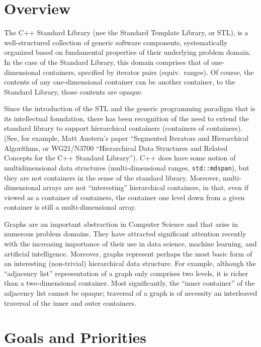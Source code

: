 
\section{Overview}

The C++ Standard Library (nee the Standard Template Library, or STL), is a well-structured collection of generic
software components, systematically organized based on fundamental properties of their underlying problem
domain.  In the case of the Standard Library, this domain comprises that of one-dimensional containers,
specified by iterator pairs (equiv.\ ranges).  Of course, the contents of any one-dimensional container can
be another container, to the Standard Library, those contents are opaque.

Since the introduction of the STL and the generic programming paradigm that is its
intellectual foundation, there has been recognition of the need to extend the
standard library to support hierarchical containers (containers of containers).
(See, for example, Matt Austern's paper ``Segmented Iterators and Hierarchical Algorithms,
or WG21/N3700
``Hierarchical Data Structures and Related Concepts for the C++ Standard Library'').
C++ does have some notion of multidimensional data structures (multi-dimensional ranges,
\lstinline{std::mdspan}), but they are not
containers in the sense of the standard library.  Moreover, multi-dimensional arrays
are not ``interesting'' hierarchical containers, in that, even if viewed as a
container of containers, the container one level down from a given container is
still a multi-dimensional array.

Graphs are an important abstraction in Computer Science and that arise in numerous problem domains.  They have
attracted significant attention recently with the increasing importance of their use in data science, machine
learning, and artificial intelligence.
%
Moreover, graphs represent perhaps the most basic form of an interesting (non-trivial) hierarchical data
structure.  For example, although the ``adjacency list'' representation of a graph only comprises two
levels, it is richer than a two-dimensional container.  Most significantly, the ``inner container''
of the adjacency list cannot be opaque; traversal of a graph is of necessity an interleaved traversal
of the inner and outer containers.


\section{Goals and Priorities}

